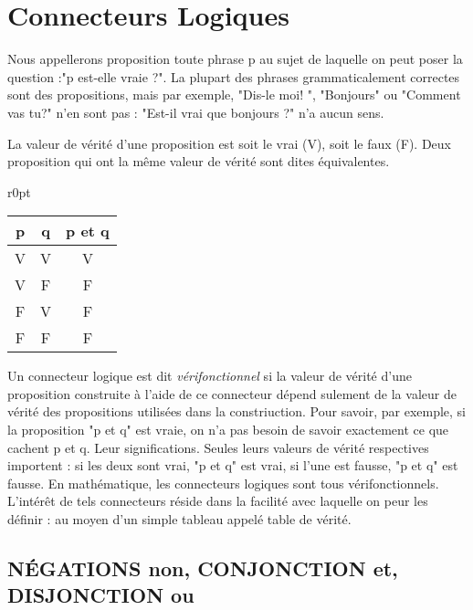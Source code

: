 \section{Connecteurs Logiques}
\begin{itemize}
	\item Nous appellerons proposition toute phrase p au sujet de laquelle on peut poser la question :"p est-elle vraie ?". La plupart des phrases grammaticalement correctes sont des propositions, mais par exemple, "Dis-le moi! ", "Bonjours" ou "Comment vas tu?" n'en sont pas : "Est-il vrai que bonjours ?" n'a aucun sens.
	\item La valeur de vérité d'une proposition est soit le vrai (V), soit le faux (F). Deux proposition qui ont la même valeur de vérité sont dites équivalentes.

	\begin{minipage}[c]{\linewidth}
	\item
	\begin{wrapfigure}{r}{0pt}
		\begin{tabular}{|c|c|c|}
			\hline
			p&q&p et q \\
			\hline
			V&V&V\\
			\hline
			V&F&F\\
			\hline
			F&V&F\\
			\hline
			F&F&F\\
			\hline
		\end{tabular}
	\end{wrapfigure}
		Un connecteur logique est dit \emph{vérifonctionnel} si la valeur de vérité d'une proposition construite à l'aide de ce connecteur dépend sulement de la valeur de vérité des propositions utilisées dans la constriuction. Pour savoir, par exemple, si la proposition "p et q" est vraie, on n'a pas besoin de savoir exactement ce que cachent p et q. Leur significations. Seules leurs valeurs de vérité respectives importent : si les deux sont vrai, "p et q" est vrai, si l'une est fausse, "p et q" est fausse. \newline En mathématique, les connecteurs logiques sont tous vérifonctionnels. L'intérêt de tels connecteurs réside dans la facilité avec laquelle on peur les définir : au moyen d'un simple tableau appelé table de vérité.
	\end{minipage}
\end{itemize}
\subsection{\bf{NÉGATIONS} non, \bf{CONJONCTION} et, \bf{DISJONCTION ou}}

